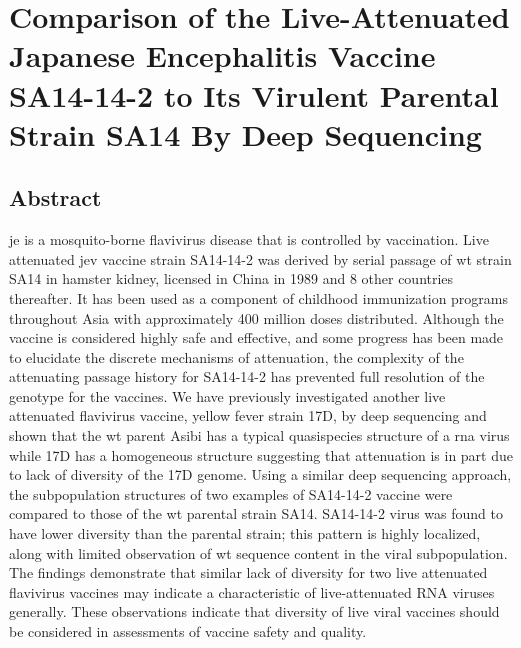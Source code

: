 %

\chapter{Comparison of the Live-Attenuated Japanese Encephalitis Vaccine SA14-14-2 to Its Virulent Parental Strain SA14 By Deep Sequencing}

\section{Abstract}
\Gls{je} is a mosquito-borne flavivirus disease that is controlled by vaccination. Live attenuated \gls{jev} vaccine strain SA14-14-2 was derived by serial passage of \gls{wt} strain SA14 in hamster kidney, licensed in China in 1989 and 8 other countries thereafter. It has been used as a component of childhood immunization programs throughout Asia with approximately 400 million doses distributed.  Although the vaccine is considered highly safe and effective, and some progress has been made to elucidate the discrete mechanisms of attenuation, the complexity of the attenuating passage history for SA14-14-2 has prevented full resolution of the genotype for the vaccines. We have previously investigated another live attenuated flavivirus vaccine, yellow fever strain 17D, by deep sequencing and shown that the \gls{wt} parent Asibi has a typical quasispecies structure of a \gls{rna} virus while 17D has a homogeneous structure suggesting that attenuation is in part due to lack of diversity of the 17D genome. Using a similar deep sequencing approach, the subpopulation structures of two examples of SA14-14-2 vaccine were compared to those of the \gls{wt} parental strain SA14. SA14-14-2 virus was found to have lower diversity than the parental strain; this pattern is highly localized, along with limited observation of \gls{wt} sequence content in the viral subpopulation. The findings demonstrate that similar lack of diversity for two live attenuated flavivirus vaccines may indicate a characteristic of live-attenuated RNA viruses generally. These observations indicate that diversity of live viral vaccines should be considered in assessments of vaccine safety and quality.



